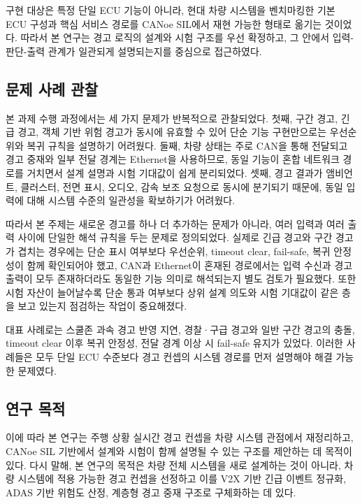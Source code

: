 \documentclass[11pt,a4paper]{article}
\begin{document}
구현 대상은 특정 단일 ECU 기능이 아니라, 현대 차량 시스템을 벤치마킹한 기본 ECU 구성과 핵심 서비스 경로를 CANoe SIL에서 재현 가능한 형태로 옮기는 것이었다. 따라서 본 연구는 경고 로직의 설계와 시험 구조를 우선 확정하고, 그 안에서 입력-판단-출력 관계가 일관되게 설명되는지를 중심으로 접근하였다.

\subsection{문제 사례 관찰}

본 과제 수행 과정에서는 세 가지 문제가 반복적으로 관찰되었다. 첫째, 구간 경고, 긴급 경고, 객체 기반 위험 경고가 동시에 유효할 수 있어 단순 기능 구현만으로는 우선순위와 복귀 규칙을 설명하기 어려웠다. 둘째, 차량 상태는 주로 CAN을 통해 전달되고 경고 중재와 일부 전달 경계는 Ethernet을 사용하므로, 동일 기능이 혼합 네트워크 경로를 거치면서 설계 설명과 시험 기대값이 쉽게 분리되었다. 셋째, 경고 결과가 앰비언트, 클러스터, 전면 표시, 오디오, 감속 보조 요청으로 동시에 분기되기 때문에, 동일 입력에 대해 시스템 수준의 일관성을 확보하기가 어려웠다.

따라서 본 주제는 새로운 경고를 하나 더 추가하는 문제가 아니라, 여러 입력과 여러 출력 사이에 단일한 해석 규칙을 두는 문제로 정의되었다. 실제로 긴급 경고와 구간 경고가 겹치는 경우에는 단순 표시 여부보다 우선순위, timeout clear, fail-safe, 복귀 안정성이 함께 확인되어야 했고, CAN과 Ethernet이 혼재된 경로에서는 입력 수신과 경고 출력이 모두 존재하더라도 동일한 기능 의미로 해석되는지 별도 검토가 필요했다. 또한 시험 자산이 늘어날수록 단순 통과 여부보다 상위 설계 의도와 시험 기대값이 같은 층을 보고 있는지 점검하는 작업이 중요해졌다.

대표 사례로는 스쿨존 과속 경고 반영 지연, 경찰·구급 경고와 일반 구간 경고의 충돌, timeout clear 이후 복귀 안정성, 전달 경계 이상 시 fail-safe 유지가 있었다. 이러한 사례들은 모두 단일 ECU 수준보다 경고 컨셉의 시스템 경로를 먼저 설명해야 해결 가능한 문제였다.

\subsection{연구 목적}

이에 따라 본 연구는 주행 상황 실시간 경고 컨셉을 차량 시스템 관점에서 재정리하고, CANoe SIL 기반에서 설계와 시험이 함께 설명될 수 있는 구조를 제안하는 데 목적이 있다. 다시 말해, 본 연구의 목적은 차량 전체 시스템을 새로 설계하는 것이 아니라, 차량 시스템에 적용 가능한 경고 컨셉을 선정하고 이를 V2X 기반 긴급 이벤트 정규화, ADAS 기반 위험도 산정, 계층형 경고 중재 구조로 구체화하는 데 있다.
\end{document}
